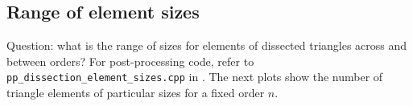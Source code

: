 \documentclass[12pt,amstags,fleqn]{article}
\theoremstyle{plain}
\theoremstyle{definition}
\begin{document}
\clearpage
\subsection{Range of element sizes}

Question: what is the range of sizes for elements of dissected
triangles across and between orders? For post-processing code, refer
to \texttt{pp\_dissection\_element\_sizes.cpp} in \cite{githubrepo}.
The next plots show the number of triangle elements of particular
sizes for a fixed order $n$.

\begin{center}
\end{center}

\begin{center}
\end{center}

\begin{center}
\end{center}

\begin{center}
\end{center}

\begin{center}
\end{center}

\begin{center}
\end{center}

\begin{center}
\end{center}

\begin{center}
\end{center}

\begin{center}
\end{center}

\begin{center}
\end{center}
\end{document}
